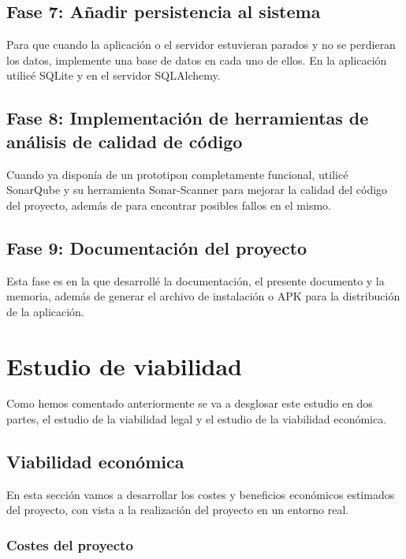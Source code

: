 \subsection{Fase 7: Añadir persistencia al sistema}

Para que cuando la aplicación o el servidor estuvieran parados y no se perdieran los datos, implemente una base de datos en cada uno de ellos. 
En la aplicación utilicé SQLite y en el servidor SQLAlchemy.

\subsection{Fase 8: Implementación de herramientas de análisis de calidad de código}

Cuando ya disponía de un prototipon completamente funcional, utilicé SonarQube y su herramienta Sonar-Scanner para mejorar la calidad del código del proyecto, además de para encontrar posibles fallos en el mismo.

\subsection{Fase 9: Documentación del proyecto}

Esta fase es en la que desarrollé la documentación, el presente documento y la memoria,
además de generar el archivo de instalación o APK para la distribución de la aplicación.



\section{Estudio de viabilidad}

Como hemos comentado anteriormente se va a desglosar este estudio en dos partes, el estudio de la viabilidad legal y el estudio de la viabilidad económica.

\subsection{Viabilidad económica}

En esta sección vamos a desarrollar los costes y beneficios económicos estimados del proyecto, con vista a la realización del proyecto en un entorno real.

\subsubsection{Costes del proyecto}

